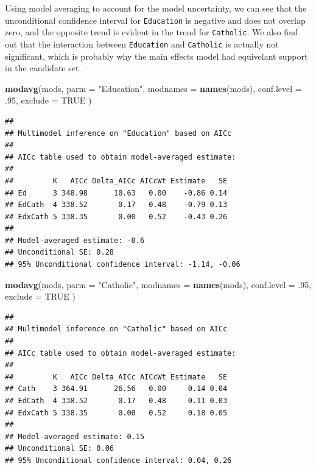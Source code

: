 \documentclass[
]{book}
\newenvironment{Shaded}{\begin{snugshade}}{\end{snugshade}}
\newcommand{\DataTypeTok}[1]{\textcolor[rgb]{0.13,0.29,0.53}{#1}}
\newcommand{\FloatTok}[1]{\textcolor[rgb]{0.00,0.00,0.81}{#1}}
\newcommand{\KeywordTok}[1]{\textcolor[rgb]{0.13,0.29,0.53}{\textbf{#1}}}
\newcommand{\NormalTok}[1]{#1}
\newcommand{\OtherTok}[1]{\textcolor[rgb]{0.56,0.35,0.01}{#1}}
\newcommand{\StringTok}[1]{\textcolor[rgb]{0.31,0.60,0.02}{#1}}
\begin{document}
Using model averaging to account for the model uncertainty, we can see that the unconditional confidence interval for \texttt{Education} is negative and does not overlap zero, and the opposite trend is evident in the trend for \texttt{Catholic}. We also find out that the interaction between \texttt{Education} and \texttt{Catholic} is actually not significant, which is probably why the main effects model had equivelant support in the candidate set.

\begin{Shaded}
\begin{Highlighting}[]
\KeywordTok{modavg}\NormalTok{(mods,}
  \DataTypeTok{parm =} \StringTok{"Education"}\NormalTok{, }\DataTypeTok{modnames =} \KeywordTok{names}\NormalTok{(mods),}
  \DataTypeTok{conf.level =} \FloatTok{.95}\NormalTok{, }\DataTypeTok{exclude =} \OtherTok{TRUE}
\NormalTok{)}
\end{Highlighting}
\end{Shaded}

\begin{verbatim}
## 
## Multimodel inference on "Education" based on AICc
## 
## AICc table used to obtain model-averaged estimate:
## 
##         K   AICc Delta_AICc AICcWt Estimate   SE
## Ed      3 348.98      10.63   0.00    -0.86 0.14
## EdCath  4 338.52       0.17   0.48    -0.79 0.13
## EdxCath 5 338.35       0.00   0.52    -0.43 0.26
## 
## Model-averaged estimate: -0.6 
## Unconditional SE: 0.28 
## 95% Unconditional confidence interval: -1.14, -0.06
\end{verbatim}

\begin{Shaded}
\begin{Highlighting}[]
\KeywordTok{modavg}\NormalTok{(mods,}
  \DataTypeTok{parm =} \StringTok{"Catholic"}\NormalTok{, }\DataTypeTok{modnames =} \KeywordTok{names}\NormalTok{(mods),}
  \DataTypeTok{conf.level =} \FloatTok{.95}\NormalTok{, }\DataTypeTok{exclude =} \OtherTok{TRUE}
\NormalTok{)}
\end{Highlighting}
\end{Shaded}

\begin{verbatim}
## 
## Multimodel inference on "Catholic" based on AICc
## 
## AICc table used to obtain model-averaged estimate:
## 
##         K   AICc Delta_AICc AICcWt Estimate   SE
## Cath    3 364.91      26.56   0.00     0.14 0.04
## EdCath  4 338.52       0.17   0.48     0.11 0.03
## EdxCath 5 338.35       0.00   0.52     0.18 0.05
## 
## Model-averaged estimate: 0.15 
## Unconditional SE: 0.06 
## 95% Unconditional confidence interval: 0.04, 0.26
\end{verbatim}
\end{document}
